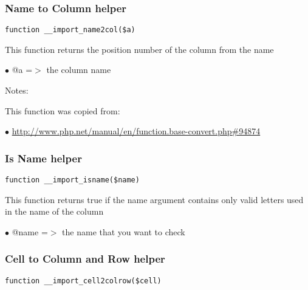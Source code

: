 \documentclass[a4paper]{article}
\def\htmladdnormallink#1#2{\href{#2}{#1}}
\begin{document}
\hypertarget{toc478}{}
\subsubsection{Name to Column helper}

\begin{lstlisting}
function __import_name2col($a)
\end{lstlisting}

This function returns the position number of the column from the name

\begin{compactitem}
\item[\color{myblue}$\bullet$] @a =$>$ the column name
\end{compactitem}

Notes:

This function was copied from:

\begin{compactitem}
\item[\color{myblue}$\bullet$] \htmladdnormallink{http://www.php.net/manual/en/function.base-convert.php\#94874}{http://www.php.net/manual/en/function.base-convert.php\#94874}
\end{compactitem}

\hypertarget{toc479}{}
\subsubsection{Is Name helper}

\begin{lstlisting}
function __import_isname($name)
\end{lstlisting}

This function returns true if the name argument contains only valid letters
used in the name of the column

\begin{compactitem}
\item[\color{myblue}$\bullet$] @name =$>$ the name that you want to check
\end{compactitem}

\hypertarget{toc480}{}
\subsubsection{Cell to Column and Row helper}

\begin{lstlisting}
function __import_cell2colrow($cell)
\end{lstlisting}
\end{document}
